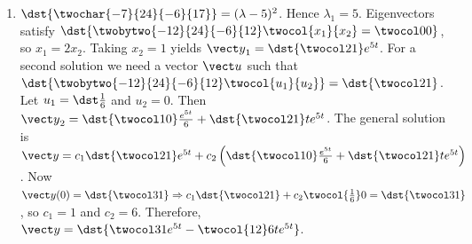 \documentclass[openany]{book}
\newenvironment{sectionSolutions}{
 \begin{enumerate}[item-label={\thesection.\arabic{enumi}.}]
}{
 \end{enumerate}
}
\begin{document}
\begin{sectionSolutions}
\item
$\dst{\twochar{-7}{24}{-6}{17}}=(\lambda-5)^2$.
Hence $\lambda_1=5$.
Eigenvectors   satisfy
$\dst{\twobytwo{-12}{24}{-6}{12}\twocol{x_1}{x_2}=\twocol00}$,
so $x_1=2x_2$.  Taking $x_2=1$ yields
${\vect y}_1=\dst{\twocol21}e^{5t}$.
For a second solution we need a vector ${\vect u}$
such that $\dst{\twobytwo{-12}{24}{-6}{12}\twocol{u_1}{u_2}}
=\dst{\twocol21}$. Let $u_1=\dst\frac{1}{6}$ and $u_2=0$. Then
${\vect y}_2=\dst{\twocol10}\frac{e^{5t}}{6}+\dst{\twocol21}te^{5t}$.
The general solution is
${\vect y}=c_1\dst{\twocol21}e^{5t}
+c_2\left(\dst{\twocol10}\frac{e^{5t}}{6}+\dst{\twocol21}te^{5t}\right)$.
Now
${\vect y}(0)=\dst{\twocol31}\Rightarrow c_1\dst{\twocol21}
+c_2{\twocol{\frac{1}{6}}0}=\dst{\twocol31}$, so $c_1=1$
and $c_2=6$. Therefore,
${\vect y}=\dst{\twocol31e^{5t}-\twocol{12}6te^{5t}}$.



\end{sectionSolutions}
\end{document}

